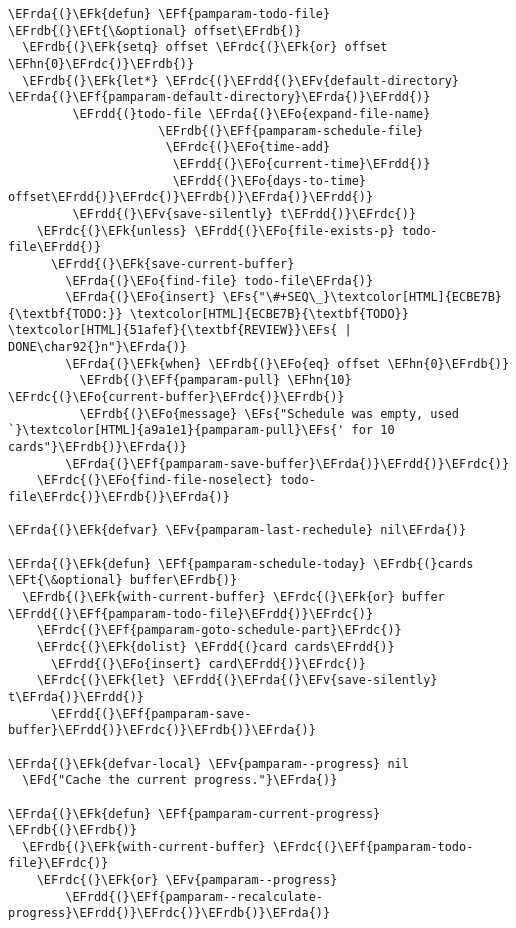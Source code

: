 \documentclass[a4wide,10pt]{article}
\newcommand{\EFs}[1]{\textcolor{EFs}{#1}} %
\newcommand{\EFd}[1]{\textcolor{EFd}{#1}} %
\newcommand{\EFk}[1]{\textcolor{EFk}{#1}} %
\newcommand{\EFf}[1]{\textcolor{EFf}{#1}} %
\newcommand{\EFv}[1]{\textcolor{EFv}{#1}} %
\newcommand{\EFt}[1]{\textcolor{EFt}{#1}} %
\newcommand{\EFo}[1]{\textcolor{EFo}{#1}} %
\newcommand{\EFhn}[1]{\textcolor{EFhn}{\textbf{#1}}} %
\newcommand{\EFrda}[1]{\textcolor{EFrda}{#1}} %
\newcommand{\EFrdb}[1]{\textcolor{EFrdb}{#1}} %
\newcommand{\EFrdc}[1]{\textcolor{EFrdc}{#1}} %
\newcommand{\EFrdd}[1]{\textcolor{EFrdd}{#1}} %
\begin{document}
\begin{Code}
\begin{Verbatim}
\EFrda{(}\EFk{defun} \EFf{pamparam-todo-file} \EFrdb{(}\EFt{\&optional} offset\EFrdb{)}
  \EFrdb{(}\EFk{setq} offset \EFrdc{(}\EFk{or} offset \EFhn{0}\EFrdc{)}\EFrdb{)}
  \EFrdb{(}\EFk{let*} \EFrdc{(}\EFrdd{(}\EFv{default-directory} \EFrda{(}\EFf{pamparam-default-directory}\EFrda{)}\EFrdd{)}
         \EFrdd{(}todo-file \EFrda{(}\EFo{expand-file-name}
                     \EFrdb{(}\EFf{pamparam-schedule-file}
                      \EFrdc{(}\EFo{time-add}
                       \EFrdd{(}\EFo{current-time}\EFrdd{)}
                       \EFrdd{(}\EFo{days-to-time} offset\EFrdd{)}\EFrdc{)}\EFrdb{)}\EFrda{)}\EFrdd{)}
         \EFrdd{(}\EFv{save-silently} t\EFrdd{)}\EFrdc{)}
    \EFrdc{(}\EFk{unless} \EFrdd{(}\EFo{file-exists-p} todo-file\EFrdd{)}
      \EFrdd{(}\EFk{save-current-buffer}
        \EFrda{(}\EFo{find-file} todo-file\EFrda{)}
        \EFrda{(}\EFo{insert} \EFs{"\#+SEQ\_}\textcolor[HTML]{ECBE7B}{\textbf{TODO:}} \textcolor[HTML]{ECBE7B}{\textbf{TODO}} \textcolor[HTML]{51afef}{\textbf{REVIEW}}\EFs{ | DONE\char92{}n"}\EFrda{)}
        \EFrda{(}\EFk{when} \EFrdb{(}\EFo{eq} offset \EFhn{0}\EFrdb{)}
          \EFrdb{(}\EFf{pamparam-pull} \EFhn{10} \EFrdc{(}\EFo{current-buffer}\EFrdc{)}\EFrdb{)}
          \EFrdb{(}\EFo{message} \EFs{"Schedule was empty, used `}\textcolor[HTML]{a9a1e1}{pamparam-pull}\EFs{' for 10 cards"}\EFrdb{)}\EFrda{)}
        \EFrda{(}\EFf{pamparam-save-buffer}\EFrda{)}\EFrdd{)}\EFrdc{)}
    \EFrdc{(}\EFo{find-file-noselect} todo-file\EFrdc{)}\EFrdb{)}\EFrda{)}

\EFrda{(}\EFk{defvar} \EFv{pamparam-last-rechedule} nil\EFrda{)}

\EFrda{(}\EFk{defun} \EFf{pamparam-schedule-today} \EFrdb{(}cards \EFt{\&optional} buffer\EFrdb{)}
  \EFrdb{(}\EFk{with-current-buffer} \EFrdc{(}\EFk{or} buffer \EFrdd{(}\EFf{pamparam-todo-file}\EFrdd{)}\EFrdc{)}
    \EFrdc{(}\EFf{pamparam-goto-schedule-part}\EFrdc{)}
    \EFrdc{(}\EFk{dolist} \EFrdd{(}card cards\EFrdd{)}
      \EFrdd{(}\EFo{insert} card\EFrdd{)}\EFrdc{)}
    \EFrdc{(}\EFk{let} \EFrdd{(}\EFrda{(}\EFv{save-silently} t\EFrda{)}\EFrdd{)}
      \EFrdd{(}\EFf{pamparam-save-buffer}\EFrdd{)}\EFrdc{)}\EFrdb{)}\EFrda{)}

\EFrda{(}\EFk{defvar-local} \EFv{pamparam--progress} nil
  \EFd{"Cache the current progress."}\EFrda{)}

\EFrda{(}\EFk{defun} \EFf{pamparam-current-progress} \EFrdb{(}\EFrdb{)}
  \EFrdb{(}\EFk{with-current-buffer} \EFrdc{(}\EFf{pamparam-todo-file}\EFrdc{)}
    \EFrdc{(}\EFk{or} \EFv{pamparam--progress}
        \EFrdd{(}\EFf{pamparam--recalculate-progress}\EFrdd{)}\EFrdc{)}\EFrdb{)}\EFrda{)}


\end{Verbatim}
\end{Code}
\end{document}
